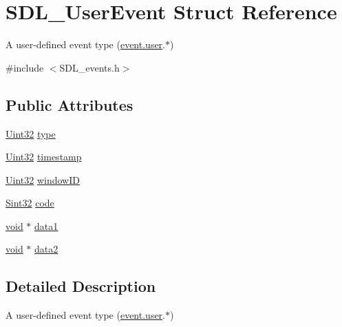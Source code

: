 \hypertarget{struct_s_d_l___user_event}{\section{S\-D\-L\-\_\-\-User\-Event Struct Reference}
\label{struct_s_d_l___user_event}
}


A user-\/defined event type (\hyperlink{union_s_d_l___event_ab7c394e3ce7bf1e4f8d68bc0e9f1b042}{event.\-user}.$\ast$)  




{\ttfamily \#include $<$S\-D\-L\-\_\-events.\-h$>$}

\subsection*{Public Attributes}
\begin{DoxyCompactItemize}
\item 
\hyperlink{_s_d_l__stdinc_8h_add440eff171ea5f55cb00c4a9ab8672d}{Uint32} \hyperlink{struct_s_d_l___user_event_ab7afa8b98dbd7b52bef41155e10f7340}{type}
\item 
\hyperlink{_s_d_l__stdinc_8h_add440eff171ea5f55cb00c4a9ab8672d}{Uint32} \hyperlink{struct_s_d_l___user_event_adbf1d34c73138a0c549310e5d4ad0c35}{timestamp}
\item 
\hyperlink{_s_d_l__stdinc_8h_add440eff171ea5f55cb00c4a9ab8672d}{Uint32} \hyperlink{struct_s_d_l___user_event_abccefa10e0e0e3a0801bc6d836a08da7}{window\-I\-D}
\item 
\hyperlink{_s_d_l__stdinc_8h_a7a90b941db9d4582e9ad7abb9940ff7e}{Sint32} \hyperlink{struct_s_d_l___user_event_aef47976781ee82b527a353c5acfa0a34}{code}
\item 
\hyperlink{_s_d_l__opengles2__gl2ext_8h_ae5d8fa23ad07c48bb609509eae494c95}{void} $\ast$ \hyperlink{struct_s_d_l___user_event_ab2893a12be2f97195f16463a23107913}{data1}
\item 
\hyperlink{_s_d_l__opengles2__gl2ext_8h_ae5d8fa23ad07c48bb609509eae494c95}{void} $\ast$ \hyperlink{struct_s_d_l___user_event_aae4dbf65c34d654c9edf519eb061b7cf}{data2}
\end{DoxyCompactItemize}


\subsection{Detailed Description}
A user-\/defined event type (\hyperlink{union_s_d_l___event_ab7c394e3ce7bf1e4f8d68bc0e9f1b042}{event.\-user}.$\ast$) 


